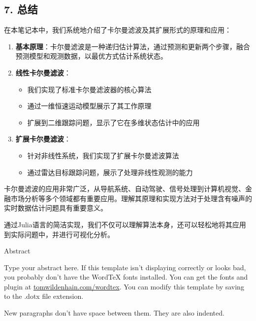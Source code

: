 \documentclass[11pt]{article}
\providecommand{\tightlist}{%
      \setlength{\itemsep}{0pt}\setlength{\parskip}{0pt}}
\begin{document}
    \subsection{7. 总结}\label{ux603bux7ed3}

在本笔记本中，我们系统地介绍了卡尔曼滤波及其扩展形式的原理和应用：

\begin{enumerate}
\def\labelenumi{\arabic{enumi}.}
\item
  \textbf{基本原理}：卡尔曼滤波是一种递归估计算法，通过预测和更新两个步骤，融合预测模型和观测数据，以最优方式估计系统状态。
\item
  \textbf{线性卡尔曼滤波}：

  \begin{itemize}
  \tightlist
  \item
    我们实现了标准卡尔曼滤波器的核心算法
  \item
    通过一维恒速运动模型展示了其工作原理
  \item
    扩展到二维跟踪问题，显示了它在多维状态估计中的应用
  \end{itemize}
\item
  \textbf{扩展卡尔曼滤波}：

  \begin{itemize}
  \tightlist
  \item
    针对非线性系统，我们实现了扩展卡尔曼滤波算法
  \item
    通过雷达目标跟踪问题，展示了处理非线性观测的能力
  \end{itemize}
\end{enumerate}

卡尔曼滤波的应用非常广泛，从导航系统、自动驾驶、信号处理到计算机视觉、金融市场分析等多个领域都有重要应用。理解其原理和实现方法对于处理含有噪声的实时数据估计问题具有重要意义。

通过Julia语言的简洁实现，我们不仅可以理解算法本身，还可以轻松地将其应用到实际问题中，并进行可视化分析。


    
    Abstract

Type your abstract here. If this template isn't displaying correctly or
looks bad, you probably don't have the WordTeX fonts installed. You can
get the fonts and plugin at
\href{http://www.tomwildenhain.com/wordtex}{tomwildenhain.com/wordtex}.
You can modify this template by saving to the .dotx file extension.

New paragraphs don't have space between them. They are also indented.
\end{document}
